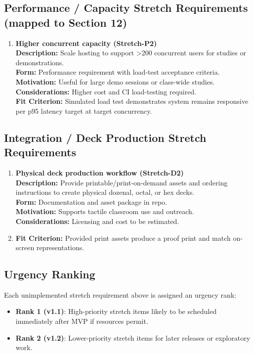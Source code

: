 \documentclass[12pt]{article}
\begin{document}
\subsection{Performance / Capacity Stretch Requirements (mapped to Section 12)}
\begin{enumerate}
  \item \textbf{Higher concurrent capacity (Stretch-P2)}\\
  \textbf{Description:} Scale hosting to support >200 concurrent users for studies or demonstrations.\\
  \textbf{Form:} Performance requirement with load-test acceptance criteria.\\
  \textbf{Motivation:} Useful for large demo sessions or class-wide studies.\\
  \textbf{Considerations:} Higher cost and CI load-testing required.\\
  \textbf{Fit Criterion:} Simulated load test demonstrates system remains responsive per p95 latency target at target concurrency.
\end{enumerate}

\subsection{Integration / Deck Production Stretch Requirements}
\begin{enumerate}
  \item \textbf{Physical deck production workflow (Stretch-D2)}\\
  \textbf{Description:} Provide printable/print-on-demand assets and ordering instructions to create physical dozenal, octal, or hex decks.\\
  \textbf{Form:} Documentation and asset package in repo.\\
  \textbf{Motivation:} Supports tactile classroom use and outreach.\\
  \textbf{Considerations:} Licensing and cost to be estimated.\\
  \item \textbf{Fit Criterion:} Provided print assets produce a proof print and match on-screen representations.
\end{enumerate}


\subsection{Urgency Ranking}
Each unimplemented stretch requirement above is assigned an urgency rank:
\begin{itemize}
  \item \textbf{Rank 1 (v1.1)}: High-priority stretch items likely to be scheduled immediately after MVP if resources permit.
  \item \textbf{Rank 2 (v1.2)}: Lower-priority stretch items for later releases or exploratory work.
\end{itemize}
\end{document}
